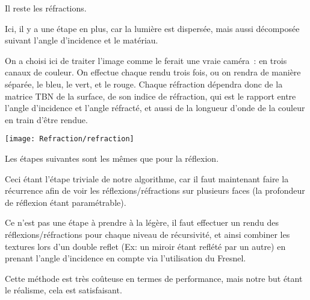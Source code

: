 Il reste les réfractions.

Ici, il y a une étape en plus, car la lumière est dispersée, mais aussi décomposée
suivant l'angle d'incidence et le matériau.

On a choisi ici de traiter l'image comme le ferait une vraie caméra~:
en trois canaux de couleur.
On effectue chaque rendu trois fois, ou on rendra de manière séparée, le bleu,
le vert, et le rouge. Chaque réfraction dépendra donc de la matrice TBN de la
surface, de son indice de réfraction, qui est le rapport entre l'angle d'incidence
et l'angle réfracté, et aussi de la longueur d'onde de la couleur
en train d'être rendue.

\texttt{[image: Refraction/refraction]}

Les étapes suivantes sont les mêmes que pour la réflexion.

Ceci étant l'étape triviale de notre algorithme, car il faut maintenant faire la
récurrence afin de voir les réflexions/réfractions sur plusieurs faces (la profondeur
de réflexion étant paramétrable).

Ce n'est pas une étape à prendre à la légère, il faut effectuer un rendu des
réflexions/réfractions pour chaque niveau de récursivité, et ainsi combiner les
textures lors d'un double reflet (Ex: un miroir étant reflété par un autre) en
prenant l'angle d'incidence en compte via l'utilisation du Fresnel.

Cette méthode est très coûteuse en termes de performance,
mais notre but étant le réalisme, cela est satisfaisant.

